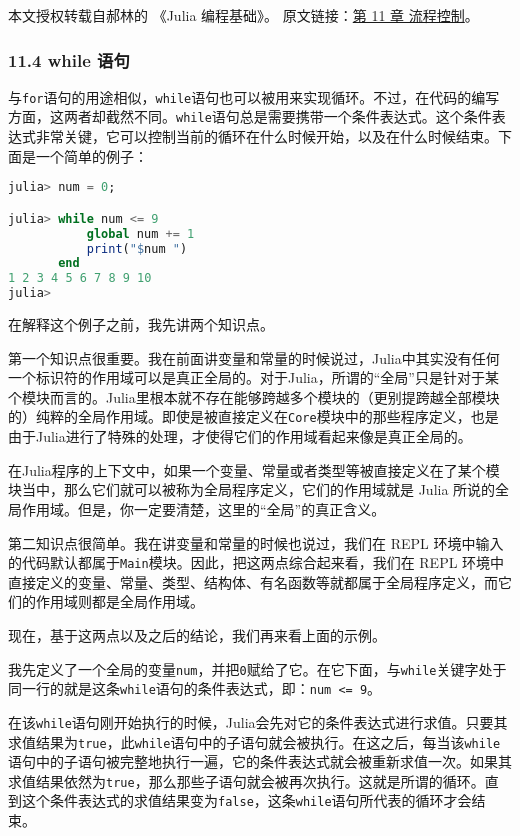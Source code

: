 
本文授权转载自郝林的 《Julia 编程基础》。 原文链接：\href{https://github.com/hyper0x/JuliaBasics/blob/master/book/ch11.md}{第 11 章 流程控制}。


\subsubsection{11.4 while 语句}

与\verb|for|语句的用途相似，\verb|while|语句也可以被用来实现循环。不过，在代码的编写方面，这两者却截然不同。\verb|while|语句总是需要携带一个条件表达式。这个条件表达式非常关键，它可以控制当前的循环在什么时候开始，以及在什么时候结束。下面是一个简单的例子：

\begin{lstlisting}[language=julia]
julia> num = 0;

julia> while num <= 9 
           global num += 1 
           print("$num ") 
       end
1 2 3 4 5 6 7 8 9 10 
julia> 
\end{lstlisting}

在解释这个例子之前，我先讲两个知识点。

第一个知识点很重要。我在前面讲变量和常量的时候说过，Julia中其实没有任何一个标识符的作用域可以是真正全局的。对于Julia，所谓的“全局”只是针对于某个模块而言的。Julia里根本就不存在能够跨越多个模块的（更别提跨越全部模块的）纯粹的全局作用域。即使是被直接定义在\verb|Core|模块中的那些程序定义，也是由于Julia进行了特殊的处理，才使得它们的作用域看起来像是真正全局的。

在Julia程序的上下文中，如果一个变量、常量或者类型等被直接定义在了某个模块当中，那么它们就可以被称为全局程序定义，它们的作用域就是 Julia 所说的全局作用域。但是，你一定要清楚，这里的“全局”的真正含义。

第二知识点很简单。我在讲变量和常量的时候也说过，我们在 REPL 环境中输入的代码默认都属于\verb|Main|模块。因此，把这两点综合起来看，我们在 REPL 环境中直接定义的变量、常量、类型、结构体、有名函数等就都属于全局程序定义，而它们的作用域则都是全局作用域。

现在，基于这两点以及之后的结论，我们再来看上面的示例。

我先定义了一个全局的变量\verb|num|，并把\verb|0|赋给了它。在它下面，与\verb|while|关键字处于同一行的就是这条\verb|while|语句的条件表达式，即：\verb|num <= 9|。

在该\verb|while|语句刚开始执行的时候，Julia会先对它的条件表达式进行求值。只要其求值结果为\verb|true|，此\verb|while|语句中的子语句就会被执行。在这之后，每当该\verb|while|语句中的子语句被完整地执行一遍，它的条件表达式就会被重新求值一次。如果其求值结果依然为\verb|true|，那么那些子语句就会被再次执行。这就是所谓的循环。直到这个条件表达式的求值结果变为\verb|false|，这条\verb|while|语句所代表的循环才会结束。

